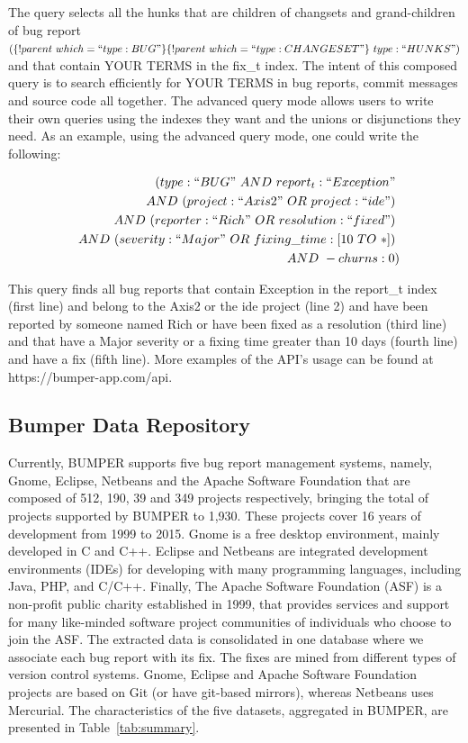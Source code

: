 \documentclass[conference]{IEEEtran}
\begin{document}
The query selects all the hunks that are children of changsets and
grand-children of bug report $ (\{!parent~which=``type:BUG"\}
  \{!parent~which=``type:CHANGESET"\}~type:``HUNKS")$
and that
contain YOUR TERMS in the fix\_t index.
The intent of this composed query is to search efficiently for
YOUR TERMS in bug reports, commit messages and source
code all together.
The advanced query mode allows users to write their own
queries using the indexes they want and the unions or disjunctions
they need.
As an example, using the advanced query mode, one
could write the following:

\begin{equation*}
\begin{split}
  (type:``BUG"~AND~report_t:``Exception"~\\
~~AND~(project:``Axis2"~OR~project:``ide")~\\
~~AND~(reporter:``Rich"~OR~resolution:``fixed")~\\
~~AND~(severity:``Major"~OR~fixing\_time:[10~TO~*])~\\
~~AND~-churns:0)
\end{split}
\end{equation*}

\vspace{0.1cm}

This query finds all bug reports that contain Exception in the
report\_t index (first line) and belong to the Axis2 or the ide
project (line 2) and have been reported by someone named Rich
or have been fixed as a resolution (third line) and that have a
Major severity or a fixing time greater than 10 days (fourth line)
and have a fix (fifth line).
More examples of the API's usage can
be found at https://bumper-app.com/api.


\subsection{Bumper Data Repository}
\label{sub:Bumper Data Repository}

Currently, BUMPER supports five bug report management systems, namely, Gnome,
Eclipse, Netbeans and the Apache Software Foundation that are composed
of 512, 190, 39 and 349 projects respectively,
bringing the total of projects supported by BUMPER to 1,930.
These projects cover 16 years of development from 1999 to 2015.
Gnome is a free desktop environment, mainly developed in C and C++.
Eclipse and Netbeans are integrated development environments (IDEs) for
developing with many programming languages, including Java, PHP, and C/C++.
Finally, The Apache Software Foundation (ASF) is a non-profit public charity
established in 1999, that provides services and support for many like-minded
software project communities of individuals who choose to join the ASF.
The extracted data is consolidated in one database where we associate each bug report with its fix.
The fixes are mined from different types of version control systems.
Gnome, Eclipse and Apache Software Foundation projects are based on Git
 (or have git-based mirrors), whereas Netbeans uses Mercurial.
The characteristics of the five datasets, aggregated in BUMPER,
are presented in Table~\ref{tab:summary}.
\end{document}
